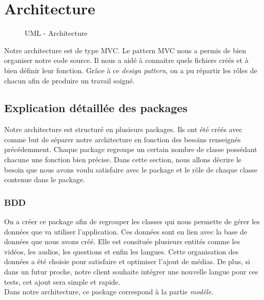 \chapter{Architecture}
 
\begin{figure}[!h]
\begin{center}
  \caption{UML - Architecture}
  \label{diaglog} 
\end{center}
\end{figure}

Notre architecture est de type MVC. Le pattern MVC nous a permis de bien organiser notre code source. Il nous a aidé à connaitre quels fichiers créés et à bien définir leur fonction. Grâce à ce \textit{design pattern}, on a pu répartir les rôles de chacun afin de produire un travail soigné.

\section{Explication détaillée des packages}

Notre architecture est structuré en plusieurs packages. Ils ont été créés avec comme but de séparer notre architecture en fonction des besoins renseignés précédemment. Chaque package regroupe un certain nombre de classe possédant chacune une fonction bien précise. Dans cette section, nous allons décrire le besoin que nous avons voulu satisfaire avec le package et le rôle de chaque classe contenue dans le package.

\subsection{BDD}

On a créer ce package afin de regrouper les classes qui nous permette de gérer les données que va utiliser l'application. Ces données sont en lien avec la base de données que nous avons créé. Elle est consituée plusieurs entités comme les vidéos, les audios, les questions et enfin les langues. Cette organisation des données a été choisie pour satisfaire et optimiser l'ajout de médias. De plus, si dans un futur proche, notre client souhaite intégrer une nouvelle langue pour ces tests, cet ajout sera simple et rapide.\\
Dans notre architecture, ce package correspond à la partie \textit{modèle}.


